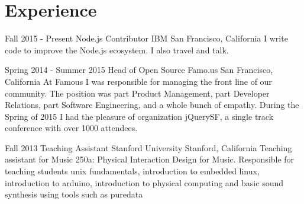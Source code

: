 \documentclass[10pt,a4paper,sans]{moderncv}   %
\begin{document}
\makecvtitle

\section{Experience}

\cventry
  {Fall 2015 - Present}
  {Node.js Contributor}
  {IBM}
  {San Francisco, California}{}
  {I write code to improve the Node.js ecosystem. I also travel and talk.}

\cventry
  {Spring 2014 - Summer 2015}
  {Head of Open Source}
  {Famo.us}
  {San Francisco, California}{}
  {At Famous I was responsible for managing the front line of our community. The position was part Product Management, part Developer Relations, part Software Engineering, and a whole bunch of empathy. During the Spring of 2015 I had the pleasure of organization jQuerySF, a single track conference with over 1000 attendees.}

\cventry
  {Fall 2013}
  {Teaching Assistant}
  {Stanford University}
  {Stanford, California}{}
  {Teaching assistant for Music 250a: Physical Interaction Design for Music.  Responsible for teaching students unix fundamentals, introduction to embedded linux, introduction to arduino, introduction to physical computing and basic sound synthesis using tools such as puredata}
\end{document}
